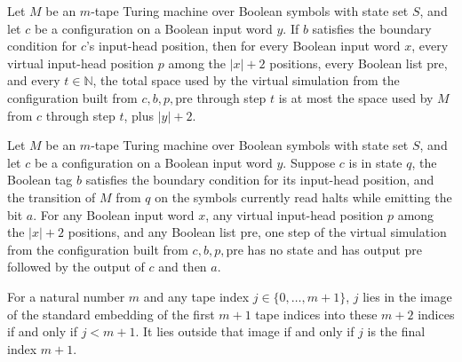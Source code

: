 \begin{theorem}
\label{Turing.vhostEmitTM_spaceUsed_le}
\leanok
{}
Let $M$ be an $m$-tape Turing machine over Boolean symbols with state set $S$, and let
$c$ be a configuration on a Boolean input word $y$. If $b$ satisfies the boundary
condition for $c$'s input-head position, then for every Boolean input word $x$, every
virtual input-head position $p$ among the $|x|+2$ positions, every Boolean list
$\mathrm{pre}$, and every $t\in\mathbb N$, the total space used by the virtual
simulation from the configuration built from $c,b,p,\mathrm{pre}$ through step $t$ is at
most the space used by $M$ from $c$ through step $t$, plus $|y|+2$.
\end{theorem}

\begin{theorem}
\label{Turing.vhostEmitTM_emitting_halt}
\leanok
{}
Let $M$ be an $m$-tape Turing machine over Boolean symbols with state set $S$, and let
$c$ be a configuration on a Boolean input word $y$. Suppose $c$ is in state $q$, the
Boolean tag $b$ satisfies the boundary condition for its input-head position, and the
transition of $M$ from $q$ on the symbols currently read halts while emitting the bit
$a$. For any Boolean input word $x$, any virtual input-head position $p$ among the
$|x|+2$ positions, and any Boolean list $\mathrm{pre}$, one step of the virtual
simulation from the configuration built from $c,b,p,\mathrm{pre}$ has no state and has
output $\mathrm{pre}$ followed by the output of $c$ and then $a$.
\end{theorem}

\begin{theorem}
\label{Turing.vhostSilent_layout}
\leanok
{}
For a natural number $m$ and any tape index $j\in\{0,\ldots,m+1\}$, $j$ lies in the
image of the standard embedding of the first $m+1$ tape indices into these $m+2$ indices
if and only if $j<m+1$. It lies outside that image if and only if $j$ is the final index
$m+1$.
\end{theorem}

